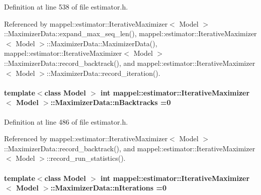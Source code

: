 Definition at line 538 of file estimator.\+h.



Referenced by mappel\+::estimator\+::\+Iterative\+Maximizer$<$ Model $>$\+::\+Maximizer\+Data\+::expand\+\_\+max\+\_\+seq\+\_\+len(), mappel\+::estimator\+::\+Iterative\+Maximizer$<$ Model $>$\+::\+Maximizer\+Data\+::\+Maximizer\+Data(), mappel\+::estimator\+::\+Iterative\+Maximizer$<$ Model $>$\+::\+Maximizer\+Data\+::record\+\_\+backtrack(), and mappel\+::estimator\+::\+Iterative\+Maximizer$<$ Model $>$\+::\+Maximizer\+Data\+::record\+\_\+iteration().

\paragraph[{\texorpdfstring{n\+Backtracks}{nBacktracks}}]{\setlength{\rightskip}{0pt plus 5cm}template$<$class Model $>$ int {\bf mappel\+::estimator\+::\+Iterative\+Maximizer}$<$ Model $>$\+::Maximizer\+Data\+::n\+Backtracks =0}\hypertarget{classmappel_1_1estimator_1_1IterativeMaximizer_1_1MaximizerData_a38c5825b8f0de1132858b23457c79fa7}{}\label{classmappel_1_1estimator_1_1IterativeMaximizer_1_1MaximizerData_a38c5825b8f0de1132858b23457c79fa7}


Definition at line 486 of file estimator.\+h.



Referenced by mappel\+::estimator\+::\+Iterative\+Maximizer$<$ Model $>$\+::\+Maximizer\+Data\+::record\+\_\+backtrack(), and mappel\+::estimator\+::\+Iterative\+Maximizer$<$ Model $>$\+::record\+\_\+run\+\_\+statistics().

\paragraph[{\texorpdfstring{n\+Iterations}{nIterations}}]{\setlength{\rightskip}{0pt plus 5cm}template$<$class Model $>$ int {\bf mappel\+::estimator\+::\+Iterative\+Maximizer}$<$ Model $>$\+::Maximizer\+Data\+::n\+Iterations =0}\hypertarget{classmappel_1_1estimator_1_1IterativeMaximizer_1_1MaximizerData_af335e6189ff196756aac6fd9b4bc53e0}{}\label{classmappel_1_1estimator_1_1IterativeMaximizer_1_1MaximizerData_af335e6189ff196756aac6fd9b4bc53e0}



